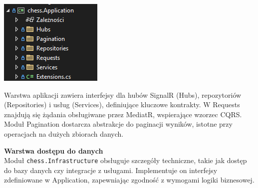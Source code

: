 \documentclass[twoside]{projektInzynierskiMS1}
\begin{document}
\vspace{0.5cm}
\noindent
\begin{minipage}[t]{0.4\textwidth}
    \vspace{0pt}
    \centering
    \includegraphics[width=\linewidth]{images/struktura_back_application.png} 
\end{minipage}
\hfill
\begin{minipage}[t]{0.5\textwidth}
    \vspace{0pt}
    \justifying \noindent
    Warstwa aplikacji zawiera interfejsy dla hubów SignalR (Hubs), repozytoriów (Repositories) i usług (Services), definiujące kluczowe kontrakty. W Requests znajdują się żądania obsługiwane przez MediatR, wspierające wzorzec CQRS. Moduł Pagination dostarcza abstrakcje do paginacji wyników, istotne przy operacjach na dużych zbiorach danych.
\end{minipage}

\newpage

\noindent \textbf{Warstwa dostępu do danych}\\
Moduł \texttt{chess.Infrastructure} obsługuje szczegóły techniczne, takie jak dostęp do bazy danych czy integracje z usługami. Implementuje on interfejsy zdefiniowane w Application, zapewniając zgodność z wymogami logiki biznesowej.
\end{document}
